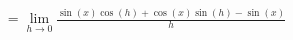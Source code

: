 \documentclass[preview]{standalone}
\begin{document}
\begin{align*}
= \lim_{h \to 0} \frac{\sin(x)\cos(h) + \cos(x)\sin(h) - \sin(x)}{h}
\end{align*}
\end{document}
